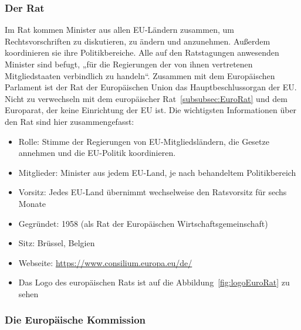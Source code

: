 \subsubsection{Der Rat}\label{subsubsec:Rat}

Im Rat kommen Minister aus allen EU-Ländern zusammen, um Rechtsvorschriften zu diskutieren, zu ändern und anzunehmen. Außerdem koordinieren sie ihre Politikbereiche. Alle auf den Ratstagungen anwesenden Minister sind befugt, „für die Regierungen der von ihnen vertretenen Mitgliedstaaten verbindlich zu handeln“.\newline
Zusammen mit dem Europäischen Parlament ist der Rat der Europäischen Union das Hauptbeschlussorgan der EU.\newline
Nicht zu verwechseln mit dem europäischer Rat~\ref{subsubsec:EuroRat} und dem Europarat, der keine Einrichtung der EU ist.\newline
Die wichtigsten Informationen über den Rat sind hier zusammengefasst:
\begin{itemize}
  \item Rolle: Stimme der Regierungen von EU-Mitgliedsländern, die Gesetze annehmen und die EU-Politik koordinieren.
  \item Mitglieder: Minister aus jedem EU-Land, je nach behandeltem Politikbereich
  \item Vorsitz: Jedes EU-Land übernimmt wechselweise den Ratsvorsitz für sechs Monate
  \item Gegründet: 1958 (als Rat der Europäischen Wirtschaftsgemeinschaft)
    \item Sitz: Brüssel, Belgien
    \item Webseite: \url{https://www.consilium.europa.eu/de/}
    \item Das Logo des europäischen Rats ist auf die Abbildung~\ref{fig:logoEuroRat} zu sehen
\end{itemize}

\subsubsection{Die Europäische Kommission}\label{subsubsec:EuroKommission}

